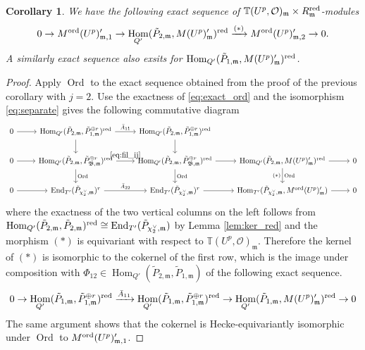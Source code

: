 \documentclass[leqno]{amsart}
\newtheorem{cor}[thm]{Corollary}
\theoremstyle{definition}
\theoremstyle{remark}
\newcommand{\oo}{\mathcal{O}}
\DeclareMathOperator{\End}{End}
\DeclareMathOperator{\Hom}{Hom}
\newcommand{\fm}{\mathfrak{m}}
\DeclareMathOperator{\Ord}{Ord} %
\newcommand{\B}{\mathfrak B} %
\newcommand{\red}{\textnormal{red}}
\newcommand{\TT}{\mathbb{T}} %
\newcommand{\ord}{\textnormal{ord}} %
\begin{document}
\begin{cor}\label{cor:fil_by_ord}
	We have the following exact sequence of
	$\TT(U^p,\oo)_\fm\times R_{\fm}^{\red}$-modules
\begin{equation}
	0\to M^{\ord}(U^p)_{\fm,1}'\to
	\Hom_{Q'}(\tilde{P}_{2,\fm},M(U^p)_{\fm}')^{\red}
    \xrightarrow{(*)}
	M^{\ord}(U^p)_{\fm,2}'\to0.
\end{equation}
A similarly exact sequence also exsits
for $\Hom_{Q'}(\tilde{P}_{1,\fm},M(U^p)_{\fm}')^{\red}$.
\end{cor}
\begin{proof}
    Apply $\Ord$ to the exact sequence
    obtained from the proof of the previous corollary
    with $j=2$.
    Use the exactness of \eqref{eq:exact_ord}
    and the isomorphism \eqref{eq:separate}
	gives the following commutative diagram
\begin{equation*}
    \begin{tikzcd}
	    0 \arrow[r]& 
	    \Hom_{Q'}(\tilde{P}_{2,\fm},\tilde{P}_{1,\fm}^{\oplus r})^{\red}
	    \arrow[r,"\bar{A}_{11}"] \arrow[d]&
	    \Hom_{Q'}(\tilde{P}_{2,\fm}, \tilde{P}_{1,\fm}^{\oplus r})^{\red}
	    \arrow[d] &&\\
	    0\arrow[r] & 
	    \Hom_{Q'}(\tilde{P}_{2,\fm},\tilde{P}_{\B,\fm}^{\oplus r})^{\red}
	    \arrow[r,"\eqref{eq:fil_ij}"] \arrow[d,"\Ord"] &
	    \Hom_{Q'}(\tilde{P}_{2,\fm},\tilde{P}_{\B,\fm}^{\oplus r})^{\red}
	    \arrow[d,"\Ord"] \arrow[r]&
	    \Hom_{Q'}(\tilde{P}_{2,\fm}, M(U^p)_{\fm}')^{\red}\arrow[r]
        \arrow[d,"\Ord", "(*)"'] &0\\
	    0\arrow[r] & 
	    \End_{T'}(\tilde{P}_{\chi_2^\vee,\fm})^{r}
	    \arrow[r,"\bar{A}_{22}"] &
	    \End_{T'}(\tilde{P}_{\chi_2^\vee,\fm})^{r}
        \arrow[r]&
        \Hom_{T'}(\tilde{P}_{\chi_2^\vee,\fm}, M^{\ord}(U^p)_\fm')
        \arrow[r]&0
    \end{tikzcd}
\end{equation*}
where the exactness of
the two vertical columns on the left follows from
$\Hom_{Q'}(\tilde{P}_{2,\fm}, \tilde{P}_{2,\fm})^{\red}
\cong \End_{T'}(\tilde{P}_{\chi_2^\vee,\fm})$
by Lemma \ref{lem:ker_red}
and the morphism $(*)$ is equivariant
with respect to $\TT(U^p,\oo)_\fm$.
Therefore the kernel of $(*)$
is isomorphic to the cokernel 
of the first row, 
which is the image under
composition with 
$\Phi_{12}\in \Hom_{Q'}(\tilde{P}_{2,\fm},\tilde{P}_{1,\fm})$
of the following exact sequence.
\[
0\to
\Hom_{Q'}(\tilde{P}_{1,\fm},\tilde{P}_{1,\fm}^{\oplus r})^{\red}
\xrightarrow{\bar{A}_{11}}
\Hom_{Q'}(\tilde{P}_{1,\fm},\tilde{P}_{1,\fm}^{\oplus r})^{\red}
\to
\Hom_{Q'}(\tilde{P}_{1,\fm}, M(U^p)_{\fm}')^{\red}
\to 0
\]
The same argument shows that 
the cokernel is Hecke-equivariantly
isomorphic under $\Ord$
to $M^{\ord}(U^p)_{\fm,1}'$.
\end{proof}  
\end{document}
